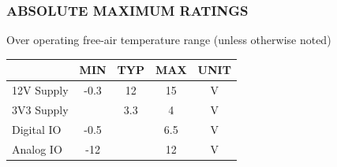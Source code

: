 \subsubsection*{ABSOLUTE MAXIMUM RATINGS}
\small{Over operating free-air temperature range (unless otherwise noted)}
\vspace{-3.5mm}
\begin{table}[h]
    \begin{tabularx}{\textwidth}{|X|c|c|c|c|}
        \hline
                                  & \textbf{ MIN } & \textbf{ TYP } & \textbf{ MAX } & \textbf{ UNIT } \\\hline
        12V Supply                & -0.3           & 12             & 15           & V                 \\\hline
        3V3 Supply                &                & 3.3            & 4            & V                 \\\hline
        Digital IO                & -0.5           &                & 6.5          & V                 \\\hline
        Analog IO                 & -12            &                & 12           & V                 \\\hline
    \end{tabularx}
\end{table}

